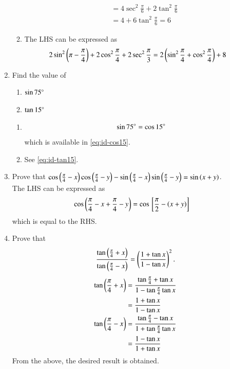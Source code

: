 \begin{enumerate}[label=\thesubsection.\arabic*,ref=\thesubsection.\theenumi,itemsep=1ex]
\begin{enumerate}
\begin{align}
	\\
	&=
	4\sec^2\frac{\pi}{6}+2\tan^{2}\frac{\pi}{6}
	\\
	&=
	4+6\tan^2\frac{\pi}{6} = 6
\end{align}
\item The LHS can be expressed as
\begin{align}
	2\sin^{2}\left(\pi -\frac{\pi}{4}\right)+2\cos^{2}\frac{\pi}{4}+2\sec^{2}\frac{\pi}{3} &= 
	2\left(\sin^{2}\frac{\pi}{4}+\cos^{2}\frac{\pi}{4}\right)+8
\end{align}
\end{enumerate}
\item Find the value of
\begin{multicols}{2}
\begin{enumerate}
\item$\sin75\degree$
\item $\tan15\degree$
\end{enumerate}
\end{multicols}
%
\solution
\begin{enumerate}
\item 
\begin{align}
\sin 75\degree 
=\cos 15\degree 
\end{align}
	 which is available in \eqref{eq:id-cos15}.
\item See
	 \eqref{eq:id-tan15}.
\end{enumerate}
\item Prove that 
 $\cos\left(\frac{\pi}{4}-x\right)\cos\left(\frac{\pi}{4}-y\right)-\sin\left(\frac{\pi}{4}-x\right)\sin\left(\frac{\pi}{4}-y\right)=\sin\left(x+y\right)$.
%
 \\
 \solution
 The LHS can be expressed as
\begin{align}
	\cos\left(\frac{\pi}{4}-x+\frac{\pi}{4}-y\right)&=\cos{}\left[\frac{\pi}{2}-\left(x+y\right)\right]
\end{align}
which is equal to the RHS.
\item Prove that 
$$\frac{\tan\left(\frac{\pi}{4}+x\right)}{\tan\left(\frac{\pi}{4}-x\right)}=\left(\frac{1+\tan x}{1-\tan x}\right)^{2}.$$
%
\solution
\begin{align}
	{\tan\ensuremath{\left(\frac{\pi}{4}+x\right)}}&=\frac{\tan\frac{\pi}{4}+\tan x}{1-\tan\frac{\pi}{4}\tan x}
	\\
	&=\frac{1+\tan x}{1-\tan x}
	\\
{\tan\left(\frac{\pi}{4}-x\right)}&=\frac{\tan\frac{\pi}{4}-\tan x}{1+\tan\frac{\pi}{4}\tan x}
	\\
	&=\frac{1-\tan x}{1+\tan x}
\end{align}
From the above, the desired result is obtained.

\end{enumerate}
